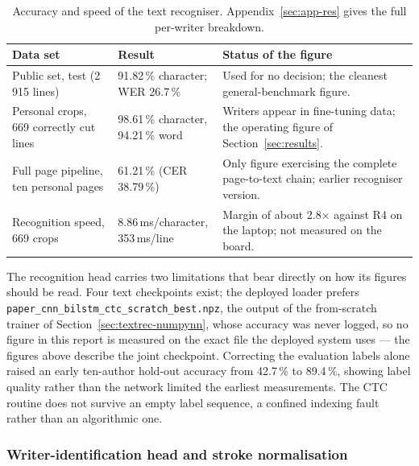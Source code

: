 \begin{table}[h]
\centering
\fontsize{8.5}{10.2}\selectfont
\setlength{\tabcolsep}{4pt}
\begin{tabularx}{\linewidth}{|p{3.1cm}|p{2.7cm}|X|}
\hline
\textbf{Data set} & \textbf{Result} & \textbf{Status of the figure} \\
\hline
Public set, test (2\,915 lines) & 91.82\,\% character; WER 26.7\,\% & Used for no decision; the cleanest general-benchmark figure. \\
\hline
Personal crops, 669 correctly cut lines & 98.61\,\% character, 94.21\,\% word & Writers appear in fine-tuning data; the operating figure of Section~\ref{sec:results}. \\
\hline
Full page pipeline, ten personal pages & 61.21\,\% (CER 38.79\,\%) & Only figure exercising the complete page-to-text chain; earlier recogniser version. \\
\hline
Recognition speed, 669 crops & 8.86\,ms/character, 353\,ms/line & Margin of about 2.8$\times$ against R4 on the laptop; not measured on the board. \\
\hline
\end{tabularx}
\caption{Accuracy and speed of the text recogniser. Appendix~\ref{sec:app-res} gives the full per-writer breakdown.}
\label{tab:rec-results}
\end{table}

\label{sec:rec-ctc-limits}
The recognition head carries two limitations that bear directly on how its figures should be read. Four text checkpoints exist; the deployed loader prefers \texttt{paper\_cnn\_bilstm\_ctc\_scratch\_best.npz}, the output of the from-scratch trainer of Section~\ref{sec:textrec-numpynn}, whose accuracy was never logged, so no figure in this report is measured on the exact file the deployed system uses --- the figures above describe the joint checkpoint.  Correcting the evaluation labels alone raised an early ten-author hold-out accuracy from 42.7\,\% to 89.4\,\%, showing label quality rather than the network limited the earliest measurements. The CTC routine does not survive an empty label sequence, a confined indexing fault rather than an algorithmic one.

\subsubsection{Writer-identification head and stroke normalisation}
\label{sec:wid-head}
\label{sec:wid-strokenorm}

